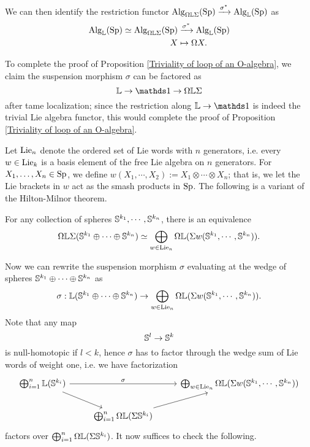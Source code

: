 We can then identify the restriction functor $\operatorname{Alg}_{ \Omega {\mathbb{L}} \Sigma}(\operatorname{Sp})\xrightarrow{\sigma^{*}} \operatorname{Alg}_{{\mathbb{L}}}(\operatorname{Sp})$ as
\begin{align*}
	\operatorname{Alg}_{{\mathbb{L}}}(\operatorname{Sp})\simeq \operatorname{Alg}_{\Omega{\mathbb{L}}\Sigma}(\operatorname{Sp}) & \xrightarrow{\sigma^*} \operatorname{Alg}_{\mathbb{L}}(\operatorname{Sp})\\
	X & \mapsto \Omega X.
\end{align*}

To complete the proof of Proposition \ref{Triviality of loop of an O-algebra},
we claim the suspension morphism $\sigma$ can be factored as 
$$
\BL \to \triv 
\to 
\Omega \BL \Sigma
$$
after tame localization;
since the restriction along $\BL \to \triv$ is indeed the trivial Lie algebra functor, this would complete the proof of Proposition \ref{Triviality of loop of an O-algebra}.

Let $\operatorname{Lie}_n$ denote the ordered set of Lie words with $n$ generators, i.e. every $w \in \operatorname{Lie}_k$ is a basis element of the free Lie algebra on $n$ generators.
For $X_1, \dots, X_n \in \operatorname{Sp}$, we define $w(X_1, \cdots, X_2):= X_1\otimes \cdots \otimes X_n$; that is, we let the Lie brackets in $w$ act as the smash products in $\operatorname{Sp}$. 
The following is a variant of the Hilton-Milnor theorem.
\begin{theorem}
	For any collection of spheres ${\mathbb{S}}^{k_1}, \cdots, {\mathbb{S}}^{k_n}$, there is an equivalence
	$$
	\Omega {\mathbb{L}} \Sigma({\mathbb{S}}^{k_1}\oplus \cdots \oplus {\mathbb{S}}^{k_n})
	\simeq 
	\bigoplus_{w\in \operatorname{Lie}_n} \Omega {\mathbb{L}}( \Sigma w({\mathbb{S}}^{k_1}, \cdots, {\mathbb{S}}^{k_n})).
	$$
\end{theorem}

Now we can rewrite the suspension morphism $\sigma$ evaluating at the wedge of spheres ${\mathbb{S}}^{k_1}\oplus \cdots \oplus {\mathbb{S}}^{k_n}$ as 
$$
\sigma: 
{\mathbb{L}}({\mathbb{S}}^{k_1}\oplus \cdots \oplus {\mathbb{S}}^{k_n})
\to 
\bigoplus_{w\in \operatorname{Lie}_n} \Omega {\mathbb{L}} (\Sigma w({\mathbb{S}}^{k_1}, \cdots, {\mathbb{S}}^{k_n})).
$$
Note that any map 
$$
{\mathbb{S}}^{l} \to 
{\mathbb{S}}^{k}
$$
is null-homotopic if $l < k$,
hence $\sigma$ has to factor through the wedge sum of Lie words of weight one, i.e. we have factorization
\[
\begin{tikzcd}
	\bigoplus_{i=1}^{n} \BL(\BS^{k_i}) &   &  \bigoplus_{w\in \Lie_n} \Omega \BL (\Sigma w(\BS^{k_1}, \cdots, \BS^{k_n}))\\
	& \bigoplus_{i=1}^{n}\Omega \BL (\Sigma \BS^{k_i})  &
	\arrow[from=1-1, to = 1-3, "\sigma"]
	\arrow[from=1-1 , to =2-2]
	\arrow[from=2-2, to=1-3]
\end{tikzcd}
\]
 factors over $\bigoplus_{i=1}^{n}\Omega {\mathbb{L}} (\Sigma {\mathbb{S}}^{k_i})$.
 It now suffices to check the following.
 
